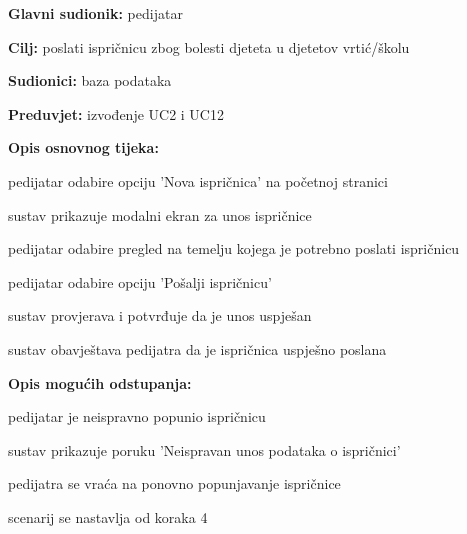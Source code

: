                     \noindent {}
					\begin{packed_item}
	
						\item \textbf{Glavni sudionik: }pedijatar
						\item  \textbf{Cilj:} poslati ispričnicu zbog bolesti djeteta u djetetov vrtić/školu
						\item  \textbf{Sudionici:} baza podataka
						\item  \textbf{Preduvjet:} izvođenje UC2 i UC12
						\item  \textbf{Opis osnovnog tijeka:}
						
						\item[] \begin{packed_enum}
	
							\item pedijatar odabire opciju 'Nova ispričnica' na početnoj stranici
							\item sustav prikazuje modalni ekran za unos ispričnice
							\item pedijatar odabire pregled na temelju kojega je potrebno poslati ispričnicu
                            \item pedijatar odabire opciju 'Pošalji ispričnicu'
                            \item sustav provjerava i potvrđuje da je unos uspješan
                            \item sustav obavještava pedijatra da je ispričnica uspješno poslana

						\end{packed_enum}
						
						\item  \textbf{Opis mogućih odstupanja:}
						
						\item[] \begin{packed_item}
	
                            \item[5.a] pedijatar je neispravno popunio ispričnicu
							\item[] \begin{packed_enum}
								\item sustav prikazuje poruku 'Neispravan unos podataka o ispričnici'
								\item pedijatra se vraća na ponovno popunjavanje ispričnice
								\item scenarij se nastavlja od koraka 4
							\end{packed_enum}


\end{packed_item}
\end{packed_item}
